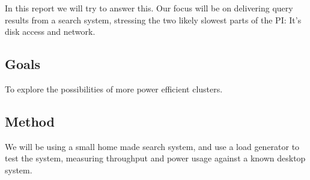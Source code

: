 In this report we will try to answer this. Our focus will be on delivering query results from a search system, stressing the two likely slowest parts of the PI:
It's disk access and network.

\subsection{Goals}
To explore the possibilities of more power efficient clusters.

\subsection{Method}
We will be using a small home made search system, and use a load generator to test the system, measuring throughput and power usage against a known desktop system.

